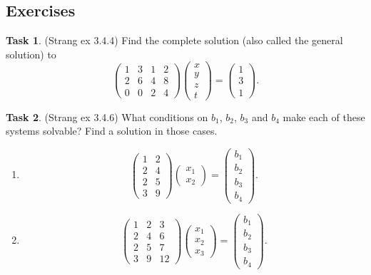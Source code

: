 \documentclass[10pt,]{book}
\theoremstyle{plain}
\theoremstyle{definition}
\numberwithin{equation}{section}
\newtheorem{task}{Task}[chapter]
\begin{document}
\subsection[Exercises]{Exercises}\label{subsection-77}
\begin{task}
\label{task-100}
(Strang ex 3.4.4)
        Find the complete solution (also called the general solution) to
        \[
          \begin{pmatrix} 1 & 3 & 1 & 2 \\
          2 & 6 & 4 & 8 \\
          0 & 0 & 2 & 4 \end{pmatrix}
          \begin{pmatrix} x \\ y \\ z \\ t \end{pmatrix} =
          \begin{pmatrix} 1 \\ 3 \\ 1 \end{pmatrix}.
        \]\end{task}
\begin{task}
\label{task-101}
(Strang ex 3.4.6)
        What conditions on \(b_1\), \(b_2\), \(b_3\) and \(b_4\) make
        each of these systems solvable? Find a solution in those cases.
        \begin{enumerate}
\item{}
            \[
              \begin{pmatrix} 1 & 2 \\ 2 & 4 \\ 2 & 5 \\ 3 & 9 \end{pmatrix}
              \begin{pmatrix} x_1 \\ x_2 \end{pmatrix} =
              \begin{pmatrix} b_1 \\ b_2 \\ b_3 \\ b_4 \end{pmatrix}.
            \]
          \item{}
            \[
              \begin{pmatrix} 1 & 2 & 3\\ 2 & 4 & 6\\
              2 & 5 & 7\\ 3 & 9 & 12\end{pmatrix}
              \begin{pmatrix} x_1 \\ x_2 \\ x_3\end{pmatrix} =
              \begin{pmatrix} b_1 \\ b_2 \\ b_3 \\ b_4 \end{pmatrix}.
            \]
          \end{enumerate}
\end{task}
\end{document}
